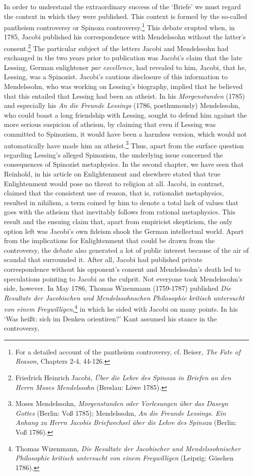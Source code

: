 In order to understand the extraordinary success of the `Briefe' we must regard the context in which they were published. This context is formed by the so{-}called pantheism controversy or Spinoza controversy.\footnote{ For a detailed account of the pantheism controversy, cf. Beiser, \textit{The Fate of Reason}, Chapters 2{-}4, 44{-}126. } This debate erupted when, in 1785, Jacobi published his correspondence with Mendelssohn without the latter's consent.\footnote{ Friedrich Heinrich Jacobi, \textit{\"{U}ber die Lehre des Spinoza in Briefen an den Herrn Moses Mendelssohn} (Breslau: L\"{o}we 1785). } The particular subject of the letters Jacobi and Mendelssohn had exchanged in the two years prior to publication was Jacobi's claim that the late Lessing, German enlightener \textit{par excellence}, had revealed to him, Jacobi, that he, Lessing, was a Spinozist. Jacobi's cautious disclosure of this information to Mendelssohn, who was working on Lessing's biography, implied that he believed that this entailed that Lessing had been an atheist. In his \textit{Morgenstunden }(1785) and especially his \textit{An die Freunde Lessings }(1786, posthumously) Mendelssohn, who could boast a long friendship with Lessing, sought to defend him against the more serious suspicion of atheism, by claiming that even if Lessing was committed to Spinozism, it would have been a harmless version, which would not automatically have made him an atheist.\footnote{ Moses Mendelssohn, \textit{Morgenstunden oder Vorlesungen \"{u}ber das Daseyn Gottes} (Berlin: Vo\ss{} 1785); Mendelssohn, \textit{An die Freunde Lessings. Ein Anhang zu Herrn Jacobis Briefwechsel \"{u}ber die Lehre des Spinoza} (Berlin: Vo\ss{} 1786). } Thus, apart from the surface question regarding Lessing's alleged Spinozism, the underlying issue concerned the consequences of Spinozist metaphysics. In the second chapter, we have seen that Reinhold, in his article on Enlightenment and elsewhere stated that true Enlightenment would pose no threat to religion at all. Jacobi, in contrast, claimed that the consistent use of reason, that is, rationalist metaphysics, resulted in nihilism, a term coined by him to denote a total lack of values that goes with the atheism that inevitably follows from rational metaphysics. This result and the ensuing claim that, apart from empiricist skepticism, the only option left was Jacobi's own fideism shook the German intellectual world. Apart from the implications for Enlightenment that could be drawn from the controversy, the debate also generated a lot of public interest because of the air of scandal that surrounded it. After all, Jacobi had published private correspondence without his opponent's consent and Mendelssohn's death led to speculations pointing to Jacobi as the culprit. Not everyone took Mendelssohn's side, however. In May 1786, Thomas Wizenmann (1759{-}1787) published \textit{Die Resultate der Jacobischen und Mendelssohnschen Philosophie kritisch untersucht von einem Freywilligen},\footnote{ Thomas Wizenmann, \textit{Die Resultate der Jacobischer und Mendelssohnischer Philosophie kritisch untersucht von einem Freywilligen} (Leipzig: G\"{o}schen 1786). } in which he sided with Jacobi on many points. In his `Was hei\ss{}t: sich im Denken orientiren?' Kant assumed his stance in the controversy, 